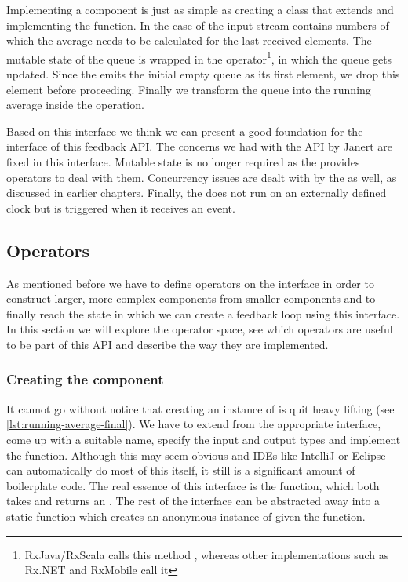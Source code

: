 Implementing a component is just as simple as creating a class that extends \comp and implementing the  function. In the case of  the input stream contains numbers of which the average needs to be calculated for the last  received elements. The mutable state of the queue is wrapped in the  operator\footnote{RxJava/RxScala calls this method , whereas other implementations such as Rx.NET and RxMobile call it }, in which the queue gets updated. Since the  emits the initial empty queue as its first element, we drop this element before proceeding. Finally we transform the queue into the running average inside the  operation.

Based on this interface we think we can present a good foundation for the interface of this feedback API. The concerns we had with the API by Janert are fixed in this interface. Mutable state is no longer required as the \obs provides operators to deal with them. Concurrency issues are dealt with by the \obs as well, as discussed in earlier chapters. Finally, the \comp does not run on an externally defined clock but is triggered when it receives an event.

\subsection{Operators}
As mentioned before we have to define operators on the \comp interface in order to construct larger, more complex components from smaller components and to finally reach the state in which we can create a feedback loop using this interface. In this section we will explore the operator space, see which operators are useful to be part of this API and describe the way they are implemented.

\subsubsection{Creating the component}
It cannot go without notice that creating an instance of \comp is quit heavy lifting (see \cref{lst:running-average-final}). We have to extend from the appropriate interface, come up with a suitable name, specify the input and output types and implement the  function. Although this may seem obvious and IDEs like IntelliJ or Eclipse can automatically do most of this itself, it still is a significant amount of boilerplate code. The real essence of this interface is the  function, which both takes and returns an \obs. The rest of the interface can be abstracted away into a static function which creates an anonymous instance of \comp given the  function.

